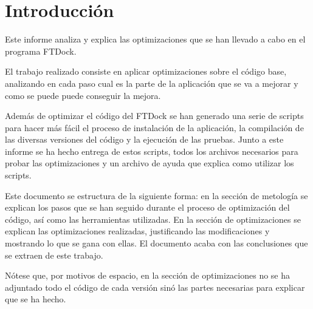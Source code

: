 \section{Introducci\'{o}n}

Este informe analiza y explica las optimizaciones que se han llevado a cabo en
el programa FTDock.

El trabajo realizado consiste en aplicar optimizaciones sobre el c\'{o}digo
base, analizando en cada paso cual es la parte de la aplicaci\'{o}n que se va a
mejorar y como se puede puede conseguir la mejora.

Adem\'{a}s de optimizar el c\'{o}digo del FTDock se han generado una serie de
scripts para hacer m\'{a}s f\'{a}cil el proceso de instalaci\'{o}n de la
aplicaci\'{o}n, la compilaci\'{o}n de las diversas versiones del c\'{o}digo y
la ejecuci\'{o}n de las pruebas. Junto a este informe se ha hecho entrega de
estos scripts, todos los archivos necesarios para probar las optimizaciones y
un archivo de ayuda que explica como utilizar los scripts.

Este documento se estructura de la siguiente forma: en la secci\'{o}n de
metolog\'{i}a se explican los pasos que se han seguido durante el proceso de
optimizaci\'{o}n del c\'{o}digo, as\'{i} como las herramientas utilizadas. En
la secci\'{o}n de optimizaciones se explican las optimizaciones realizadas,
justificando las modificaciones y mostrando lo que se gana con ellas. El
documento acaba con las conclusiones que se extraen de este trabajo.

N\'{o}tese que, por motivos de espacio, en la secci\'{o}n de optimizaciones no
se ha adjuntado todo el c\'{o}digo de cada versi\'{o}n sin\'{o} las partes
necesarias para explicar que se ha hecho.

